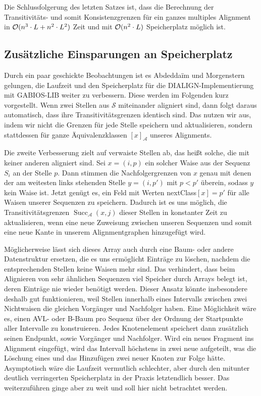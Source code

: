 Die Schlussfolgerung des letzten Satzes ist, dass die Berechnung der Transitivitäts- und somit Konsistenzgrenzen für ein ganzes multiples Alignment in $\mathcal{O}(n^3\cdot L + n^2\cdot L^2)$ Zeit und mit $\mathcal{O}(n^2\cdot L)$ Speicherplatz möglich ist. 

\subsection{Zusätzliche Einsparungen an Speicherplatz}\label{subsec:einsparungen}

Durch ein paar geschickte Beobachtungen ist es Abdedda\"im und Morgenstern gelungen, die Laufzeit und den Speicherplatz für die DIALIGN-Implementierung mit GABIOS-LIB weiter zu verbessern\cite{am00}. Diese werden im Folgenden kurz vorgestellt. Wenn zwei Stellen aus $\mathcal{S}$ miteinander aligniert sind, dann folgt daraus automatisch, dass ihre Transitivitätsgrenzen identisch sind. Das nutzen wir aus, indem wir nicht die Grenzen für jede Stelle speichern und aktualisieren, sondern stattdessen für ganze Äquivalenzklassen $[x]_{\mathcal{A}}$ unseres Alignments.

Die zweite Verbesserung zielt auf verwaiste Stellen ab, das heißt solche, die mit keiner anderen aligniert sind. Sei $x = (i,p)$ ein solcher Waise aus der Sequenz $S_i$ an der Stelle $p$. Dann stimmen die Nachfolgergrenzen von $x$ genau mit denen der am weitesten links stehenden Stelle $y = (i,p')$ mit $p < p'$ überein, sodass $y$ kein Waise ist.
Jetzt genügt es, ein Feld mit Werten \textrm{nextClass}$[x] = p'$ für alle Waisen unserer Sequenzen zu speichern. Dadurch ist es uns möglich, die Transitivitätsgrenzen $\operatorname{Succ}_{\mathcal{A}}(x,j)$ dieser Stellen in konstanter Zeit zu aktualisieren, wenn eine neue Zuweisung zwischen unseren Sequenzen und somit eine neue Kante in unserem Alignmentgraphen hinzugefügt wird. 

Möglicherweise lässt sich dieses Array auch durch eine Baum- oder andere Datenstruktur ersetzen, die es uns ermöglicht Einträge zu löschen, nachdem die entsprechenden Stellen keine Waisen mehr sind. Das verhindert, dass beim Alignieren von sehr ähnlichen Sequenzen viel Speicher durch Arrays belegt ist, deren Einträge nie wieder benötigt werden. Dieser Ansatz könnte insbesondere deshalb gut funktionieren, weil Stellen innerhalb eines Intervalls zwischen zwei Nichtwaisen die gleichen Vorgänger und Nachfolger haben. Eine Möglichkeit wäre es, einen AVL- oder B-Baum pro Sequenz über der Ordnung der Startpunkte aller Intervalle zu konstruieren. Jedes Knotenelement speichert dann zusätzlich seinen Endpunkt, sowie Vorgänger und Nachfolger. Wird ein neues Fragment ins Alignment eingefügt, wird das Intervall höchstens in zwei neue aufgeteilt, was die Löschung eines und das Hinzufügen zwei neuer Knoten zur Folge hätte. Asymptotisch wäre die Laufzeit vermutlich schlechter, aber durch den mitunter deutlich verringerten Speicherplatz in der Praxis letztendlich besser. Das weiterzuführen ginge aber zu weit und soll hier nicht betrachtet werden.

